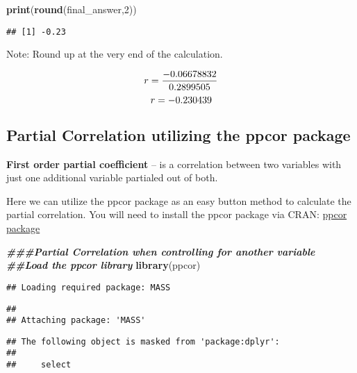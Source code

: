 \documentclass[
]{book}
\newenvironment{Shaded}{\begin{snugshade}}{\end{snugshade}}
\newcommand{\DecValTok}[1]{\textcolor[rgb]{0.00,0.00,0.81}{#1}}
\newcommand{\DocumentationTok}[1]{\textcolor[rgb]{0.56,0.35,0.01}{\textbf{\textit{#1}}}}
\newcommand{\FunctionTok}[1]{\textcolor[rgb]{0.13,0.29,0.53}{\textbf{#1}}}
\newcommand{\NormalTok}[1]{#1}
\theoremstyle{definition}
\theoremstyle{definition}
\theoremstyle{definition}
\theoremstyle{definition}
\theoremstyle{remark}
\begin{document}
\begin{Shaded}
\begin{Highlighting}[]
\FunctionTok{print}\NormalTok{(}\FunctionTok{round}\NormalTok{(final\_answer,}\DecValTok{2}\NormalTok{))}
\end{Highlighting}
\end{Shaded}

\begin{verbatim}
## [1] -0.23
\end{verbatim}

Note: Round up at the very end of the calculation.

\[\large
r = \frac{-0.06678832}{0.2899505}
\]
\[\large
r = -0.230439
\]

\hypertarget{partial-correlation-utilizing-the-ppcor-package}{%
\subsection{Partial Correlation utilizing the ppcor package}\label{partial-correlation-utilizing-the-ppcor-package}}

\textbf{First order partial coefficient} -- is a correlation between two variables with just one additional variable partialed out of both.

Here we can utilize the ppcor package as an easy button method to calculate the partial correlation. You will need to install the ppcor package via CRAN: \href{https://cran.r-project.org/web/packages/ppcor/index.html}{ppcor package}

\begin{Shaded}
\begin{Highlighting}[]
\DocumentationTok{\#\#\#Partial Correlation when controlling for another variable}
\DocumentationTok{\#\#Load the ppcor library}
\FunctionTok{library}\NormalTok{(ppcor)}
\end{Highlighting}
\end{Shaded}

\begin{verbatim}
## Loading required package: MASS
\end{verbatim}

\begin{verbatim}
## 
## Attaching package: 'MASS'
\end{verbatim}

\begin{verbatim}
## The following object is masked from 'package:dplyr':
## 
##     select
\end{verbatim}
\end{document}
